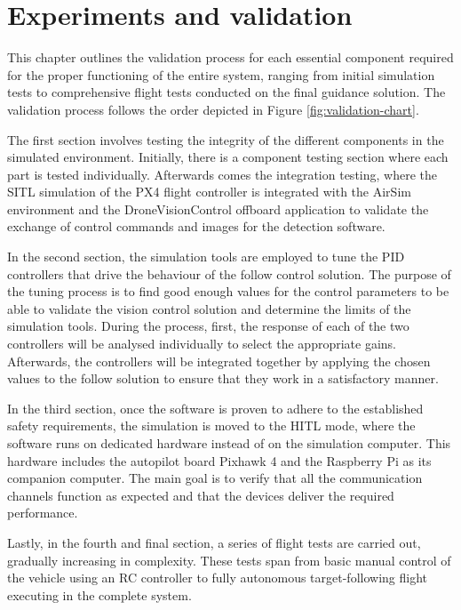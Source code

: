 \chapter{Experiments and validation}
\label{chap:validation}

This chapter outlines the validation process for each essential component required for the proper functioning of the entire system, ranging from initial simulation tests to comprehensive flight tests conducted on the final guidance solution. The validation process follows the order depicted in Figure \ref{fig:validation-chart}.

The first section involves testing the integrity of the different components in the simulated environment. Initially, there is a component testing section where each part is tested individually. Afterwards comes the integration testing, where the SITL simulation of the PX4 flight controller is integrated with the AirSim environment and the DroneVisionControl offboard application to validate the exchange of control commands and images for the detection software.

In the second section, the simulation tools are employed to tune the PID controllers that drive the behaviour of the follow control solution. The purpose of the tuning process is to find good enough values for the control parameters to be able to validate the vision control solution and determine the limits of the simulation tools. During the process, first, the response of each of the two controllers will be analysed individually to select the appropriate gains. Afterwards, the controllers will be integrated together by applying the chosen values to the follow solution to ensure that they work in a satisfactory manner.

In the third section, once the software is proven to adhere to the established safety requirements, the simulation is moved to the HITL mode, where the software runs on dedicated hardware instead of on the simulation computer. This hardware includes the autopilot board Pixhawk 4 and the Raspberry Pi as its companion computer. The main goal is to verify that all the communication channels function as expected and that the devices deliver the required performance.

Lastly, in the fourth and final section, a series of flight tests are carried out, gradually increasing in complexity. These tests span from basic manual control of the vehicle using an RC controller to fully autonomous target-following flight executing in the complete system.

